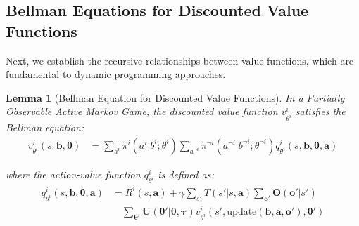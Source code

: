 \documentclass[a4paper,12pt]{report}
\newtheorem{lemma}{Lemma}
\begin{document}
\subsection{Bellman Equations for Discounted Value Functions}
Next, we establish the recursive relationships between value functions, which
are fundamental to dynamic programming approaches.
\begin{lemma}[Bellman Equation for Discounted Value Functions]
    In a Partially Observable Active Markov Game, the discounted value function
    $v^{i}_{\theta^i}$ satisfies the Bellman equation:
    \begin{align}
        v^{i}_{\theta^i}(s, \boldsymbol{b}, \boldsymbol{\theta}) & = \sum_{a^i}\pi^{i}(a^{i}|b^{i}; \theta^{i}) \sum_{a^{\neg i}}\pi^{\neg i}(a^{\neg i}|b^{\neg i}; \theta^{\neg i}) q^{i}_{\theta^i}(s, \boldsymbol{b}, \boldsymbol{\theta}, \boldsymbol{a})
    \end{align}

    where the action-value function $q^{i}_{\theta^i}$ is defined as:
    \begin{align}
        q^{i}_{\theta^i}(s, \boldsymbol{b}, \boldsymbol{\theta}, \boldsymbol{a}) & = R^{i}(s, \boldsymbol{a}) + \gamma \sum_{s'}T(s'|s, \boldsymbol{a}) \sum_{\boldsymbol{o}'}\boldsymbol{O}(\boldsymbol{o}'|s') \nonumber                                                                                 \\
                                                                                 & \quad \sum_{\boldsymbol{\theta}'}\boldsymbol{U}(\boldsymbol{\theta}'|\boldsymbol{\theta}, \boldsymbol{\tau}) v^{i}_{\theta^i}(s', \text{update}(\boldsymbol{b}, \boldsymbol{a}, \boldsymbol{o}'), \boldsymbol{\theta}')
    \end{align}
\end{lemma}
\end{document}
